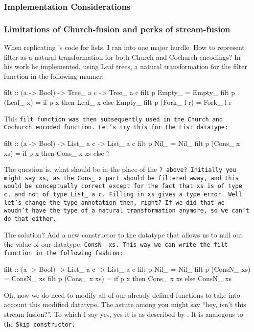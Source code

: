 \subsubsection{Implementation Considerations}
\subsubsection{Limitations of Church-fusion and perks of stream-fusion}
When replicating \cite{Harper2011}'s code for lists, I ran into one major hurdle:
How to represent filter as a natural transformation for both Church and Cochurch encodings?
In his work he implemented, using Leaf trees, a natural transformation for the filter function in the following manner:
\begin{code}
filt :: (a -> Bool) -> Tree_ a c -> Tree_ a c
filt p Empty_ = Empty_
filt p (Leaf_ x) = if p x then Leaf_ x else Empty_
filt p (Fork_ l r) = Fork_ l r
\end{code}
This \tt{filt} function was then subsequently used in the Church and Cochurch encoded function.
Let's try this for the \tt{List} datatype:
\begin{code}
filt :: (a -> Bool) -> List_ a c -> List_ a c
filt p Nil_ = Nil_
filt p (Cons_ x xs) = if p x then Cons_ x xs else ? 
\end{code}
The question is, what should be in the place of the \tt{?} above?
Initially you might say \tt{xs}, as the \tt{Cons\_ x} part should be filtered away, and this would be conceptually correct except for the fact that \tt{xs} is of type \tt{c}, and not of type \tt{List\_ a c}.
Filling in \tt{xs} gives a type error.
Well let's change the type annotation then, right?
If we did that we woudn't have the type of a natural transformation anymore, so we can't do that either.

The solution? Add a new constructor to the datatype that allows us to null out the value of our datatype: \tt{ConsN\_ xs}.
This way we can write the \tt{filt} function in the following fashion:
\begin{code}
filt :: (a -> Bool) -> List_ a c -> List_ a c
filt p Nil_ = Nil_
filt p (ConsN_ xs) = ConsN_ xs
filt p (Cons_ x xs) = if p x then Cons_ x xs else ConsN_ xs
\end{code}
Oh, now we do need to modify all of our already defined functions to take into account this modified datatype.
The astute among you might say ``hey, isn't this stream fusion?''.
To which I say yes, yes it is as described by \cite{Coutts2007}.
It is analogous to the \tt{Skip} constructor.

